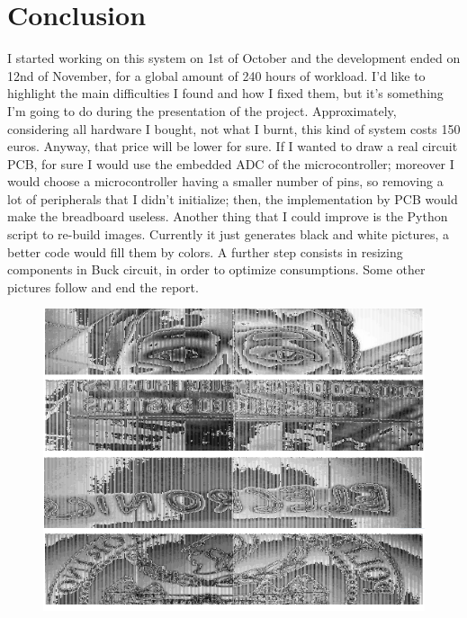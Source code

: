 \section{Conclusion}

I started working on this system on 1st of October and the development ended on 12nd of November, for a global amount of 240 hours of workload.
I'd like to highlight the main difficulties I found and how I fixed them, but it's something I'm going to do during the presentation of the project.
\newline
Approximately, considering all hardware I bought, not what I burnt, this kind of system costs 150 euros. Anyway, that price will be lower for sure. If I wanted to draw a real circuit PCB, for sure I would use the embedded ADC of the microcontroller; moreover I would choose a microcontroller having a smaller number of pins, so removing a lot of peripherals that I didn't initialize; then, the implementation by PCB would make the breadboard useless.
\newline
Another thing that I could improve is the Python script to re-build images. Currently it just generates black and white pictures, a better code would fill them by colors.
\newline
A further step consists in resizing components in Buck circuit, in order to optimize consumptions. Some other pictures follow and end the report.
\begin{figure}[H]
\centering
\includegraphics[scale=.9]{Immagini/test99}
\label{04}
\end{figure}

